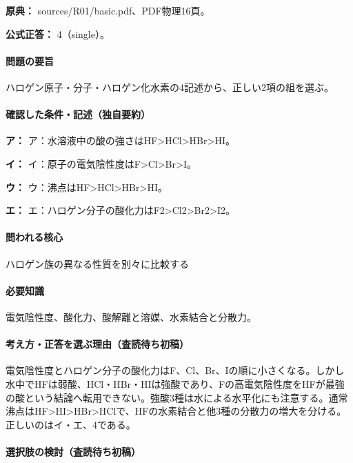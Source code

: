 \noindent\textbf{原典：} sources/R01/basic.pdf、PDF物理16頁。

\textbf{公式正答：} 4（single）。

\paragraph{問題の要旨} ハロゲン原子・分子・ハロゲン化水素の4記述から、正しい2項の組を選ぶ。

\paragraph{確認した条件・記述（独自要約）}\mbox{}\par

\noindent\textbf{ア：} ア：水溶液中の酸の強さはHF>HCl>HBr>HI。\par

\noindent\textbf{イ：} イ：原子の電気陰性度はF>Cl>Br>I。\par

\noindent\textbf{ウ：} ウ：沸点はHF>HCl>HBr>HI。\par

\noindent\textbf{エ：} エ：ハロゲン分子の酸化力はF2>Cl2>Br2>I2。\par

\paragraph{問われる核心} ハロゲン族の異なる性質を別々に比較する

\paragraph{必要知識} 電気陰性度、酸化力、酸解離と溶媒、水素結合と分散力。

\paragraph{考え方・正答を選ぶ理由（査読待ち初稿）} 電気陰性度とハロゲン分子の酸化力はF、Cl、Br、Iの順に小さくなる。しかし水中でHFは弱酸、HCl・HBr・HIは強酸であり、Fの高電気陰性度をHFが最強の酸という結論へ転用できない。強酸3種は水による水平化にも注意する。通常沸点はHF>HI>HBr>HClで、HFの水素結合と他3種の分散力の増大を分ける。正しいのはイ・エ、4である。

\paragraph{選択肢の検討（査読待ち初稿）}\mbox{}\par

